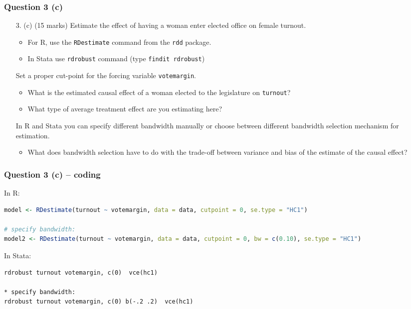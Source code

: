 \documentclass[xcolor=table,dvipsnames]{beamer}
\begin{document}
\begin{frame}
\frametitle{Question 3 (c)}
\begin{enumerate}
\item[3.] (c) (15 marks) Estimate the effect of having a woman enter elected office on female turnout. \pause
	\begin{itemize}
	\item For R, use the \texttt{RDestimate} command from the \texttt{rdd} package. \pause
	\item In Stata use \texttt{rdrobust} command (type \texttt{findit rdrobust}) \pause 
	\end{itemize}
Set a proper cut-point for the forcing variable \texttt{votemargin}. \pause
	\begin{itemize}
	\item What is the estimated causal effect of a woman elected to the legislature on \texttt{turnout}? \pause
	\item What type of average treatment effect are you estimating here? \pause
	\end{itemize} 
In R and Stata you can specify different bandwidth manually or choose between different bandwidth selection mechanism for estimation. \pause
	\begin{itemize}
	\item What does bandwidth selection have to do with the trade-off between variance and bias of the estimate of the causal effect? 
	\end{itemize}
\end{enumerate}
\end{frame}

\begin{frame}[fragile]
\frametitle{Question 3 (c) -- coding}
In R:
\begin{lstlisting}[language=R]
model <- RDestimate(turnout ~ votemargin, data = data, cutpoint = 0, se.type = "HC1")

# specify bandwidth:
model2 <- RDestimate(turnout ~ votemargin, data = data, cutpoint = 0, bw = c(0.10), se.type = "HC1")
\end{lstlisting}\pause

In Stata:
\begin{lstlisting}
rdrobust turnout votemargin, c(0)  vce(hc1)

* specify bandwidth:
rdrobust turnout votemargin, c(0) b(-.2 .2)  vce(hc1)
\end{lstlisting}
\end{frame}
\end{document}
